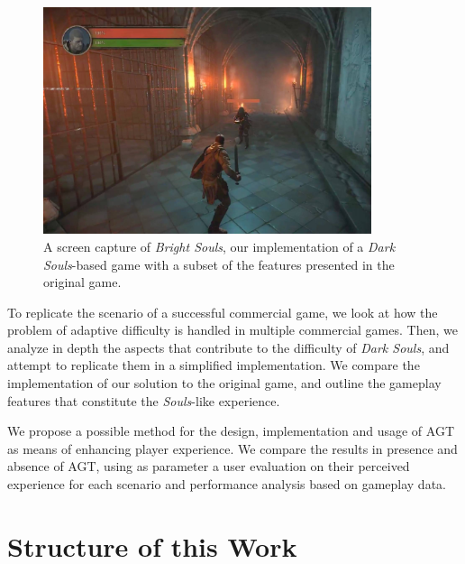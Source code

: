 \begin{figure}[!ht]
    \caption{A screen capture of \emph{Bright Souls}, our implementation of a \emph{Dark Souls}-based game with a subset of the features presented in the original game.}
    \begin{center}
        \includegraphics[width=26em]{figures/fig-bright-souls.jpg}
    \end{center}
    \label{fig:ex1}
\end{figure}

To replicate the scenario of a successful commercial game, we look at how the problem of adaptive difficulty  is handled in multiple commercial games. Then, we analyze in depth the aspects that contribute to the difficulty of \emph{Dark Souls}, and attempt to replicate them in a simplified implementation. We compare the implementation of our solution to the original game, and outline the gameplay features that constitute the \emph{Souls}-like experience.

We propose a possible method for the design, implementation and usage of AGT as means of enhancing player experience. We compare the results in presence and absence of AGT, using as parameter a user evaluation on their perceived experience for each scenario and performance analysis based on gameplay data.


\section{Structure of this Work}






